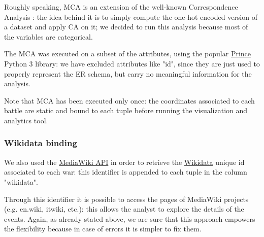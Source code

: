 Roughly speaking, MCA is an extension of the well-known Correspondence Analysis \cite{Hill74}: the idea behind it is to simply compute the one-hot encoded version of a dataset and apply CA on it; we decided to run this analysis because most of the variables are categorical.

The MCA was executed on a subset of the attributes, using the popular \href{https://pypi.org/project/prince}{Prince} Python 3 library: we have excluded attributes like "id", since they are just used to properly represent the ER schema, but carry no meaningful information for the analysis.

Note that MCA has been executed only once: the coordinates associated to each battle are static and bound to each tuple before running the visualization and analytics tool.

\subsubsection{Wikidata binding}
We also used the \href{https://www.mediawiki.org/wiki/API:Main_page}{MediaWiki API} in order to retrieve the \href{https://wikidata.org}{Wikidata} unique id associated to each war: this identifier is appended to each tuple in the column "wikidata".

Through this identifier it is possible to access the pages of MediaWiki projects (e.g. en.wiki, itwiki, etc.): this allows the analyst to explore the details of the events. Again, as already stated above, we are sure that this approach empowers the flexibility because in case of errors it is simpler to fix them.
